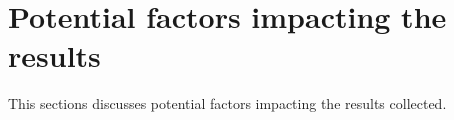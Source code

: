 \section{Potential factors impacting the results}
\label{sec:truth_results}

This sections discusses potential factors impacting the results collected.







